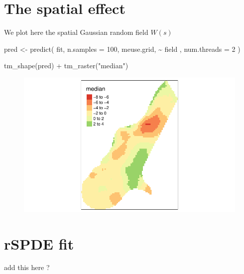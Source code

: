 \documentclass[
  a4paper,
]{article}
\newenvironment{Shaded}{\begin{snugshade}}{\end{snugshade}}
\newcommand{\AttributeTok}[1]{\textcolor[rgb]{0.40,0.45,0.13}{#1}}
\newcommand{\DecValTok}[1]{\textcolor[rgb]{0.68,0.00,0.00}{#1}}
\newcommand{\FunctionTok}[1]{\textcolor[rgb]{0.28,0.35,0.67}{#1}}
\newcommand{\NormalTok}[1]{\textcolor[rgb]{0.00,0.23,0.31}{#1}}
\newcommand{\OtherTok}[1]{\textcolor[rgb]{0.00,0.23,0.31}{#1}}
\newcommand{\SpecialCharTok}[1]{\textcolor[rgb]{0.37,0.37,0.37}{#1}}
\newcommand{\StringTok}[1]{\textcolor[rgb]{0.13,0.47,0.30}{#1}}
\begin{document}
\hypertarget{the-spatial-effect}{%
\section{The spatial effect}\label{the-spatial-effect}}

We plot here the spatial Gaussian random field \(W(s)\)

\begin{Shaded}
\begin{Highlighting}[]
\NormalTok{pred }\OtherTok{\textless{}{-}} \FunctionTok{predict}\NormalTok{(}
\NormalTok{  fit,}
  \AttributeTok{n.samples =} \DecValTok{100}\NormalTok{,}
\NormalTok{  meuse.grid,}
  \SpecialCharTok{\textasciitilde{}}\NormalTok{ field  ,}
  \AttributeTok{num.threads =} \DecValTok{2}
\NormalTok{)}

\FunctionTok{tm\_shape}\NormalTok{(pred) }\SpecialCharTok{+} \FunctionTok{tm\_raster}\NormalTok{(}\StringTok{"median"}\NormalTok{)}
\end{Highlighting}
\end{Shaded}

\begin{figure}[H]

{\centering \includegraphics{pedometron_files/figure-pdf/unnamed-chunk-14-1.pdf}

}

\end{figure}

\hypertarget{rspde-fit}{%
\section{rSPDE fit}\label{rspde-fit}}

add this here ?
\end{document}
